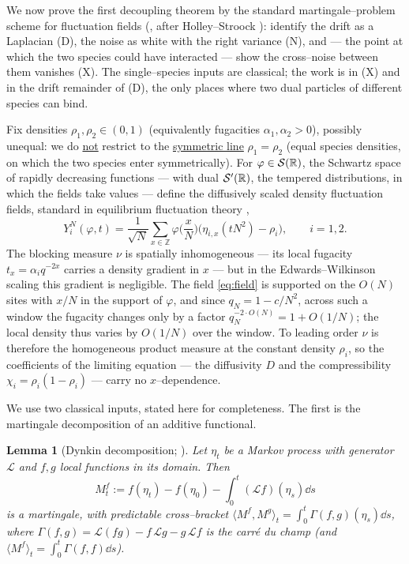 \documentclass[11pt]{article}
\theoremstyle{plain}
\newtheorem{lemma}[theorem]{Lemma}
\theoremstyle{definition}
\theoremstyle{remark}
\newcommand{\Z}{\mathbb{Z}}\newcommand{\R}{\mathbb{R}}\newcommand{\N}{\mathbb{N}}
\newcommand{\cL}{\mathcal L}\newcommand{\cO}{\mathcal O}\newcommand{\cE}{\mathcal E}
\begin{document}
We now prove the first decoupling theorem by the standard martingale--problem scheme for
fluctuation fields (\cite[Ch.~11]{KL}, after Holley--Stroock \cite{HolleyStroock}):
identify the drift as a Laplacian (D), the noise as white with the
right variance (N), and --- the point at which the two species could have interacted ---
show the cross--noise between them vanishes (X). The single--species inputs are
classical; the work is in (X) and in the drift remainder of (D), the only places where
two dual particles of different species can bind.

Fix densities $\rho_1,\rho_2\in(0,1)$ (equivalently fugacities $\alpha_1,\alpha_2>0$),
possibly unequal: we do \underline{not} restrict to the \underline{symmetric line} $\rho_1=\rho_2$
(equal species densities, on which the two species enter symmetrically). For
$\varphi\in\cS(\R)$, the Schwartz space of rapidly decreasing functions --- with dual
$\cS'(\R)$, the tempered distributions, in which the fields take values --- define the
diffusively scaled density fluctuation fields, standard in equilibrium fluctuation
theory \cite[Ch.~11]{KL},
\begin{equation}\label{eq:field}
  Y_i^N(\varphi,t)=\frac1{\sqrt N}\sum_{x\in\Z}\varphi\Big(\frac xN\Big)
   \big(\eta_{i,x}(tN^2)-\rho_i\big),\qquad i=1,2.
\end{equation}
The blocking measure $\nu$ is spatially inhomogeneous --- its local fugacity
$t_x=\alpha_i q^{-2x}$ carries a density gradient in $x$ --- but in the
Edwards--Wilkinson scaling this gradient is negligible. The field \eqref{eq:field} is
supported on the $O(N)$ sites with $x/N$ in the support of $\varphi$, and since
$q_N=1-c/N^2$, across such a window the fugacity changes only by a factor
$q_N^{-2\cdot O(N)}=1+O(1/N)$; the local density thus varies by $O(1/N)$ over the
window. To leading order $\nu$ is therefore the homogeneous product measure at the
constant density $\rho_i$, so the coefficients of the limiting equation --- the
diffusivity $D$ and the compressibility $\chi_i=\rho_i(1-\rho_i)$ --- carry no
$x$--dependence.

We use two classical inputs, stated here for completeness. The first is the martingale
decomposition of an additive functional.

\begin{lemma}[Dynkin decomposition; {\cite[App.~1.5]{KL}}]\label{lem:dynkin}
Let $\eta_t$ be a Markov process with generator $\cL$ and $f,g$ local functions in its
domain. Then
\[
  M^f_t:=f(\eta_t)-f(\eta_0)-\int_0^t(\cL f)(\eta_s)\dd s
\]
is a martingale, with predictable cross--bracket
$\langle M^f,M^g\rangle_t=\int_0^t\Gamma(f,g)(\eta_s)\dd s$, where
$\Gamma(f,g)=\cL(fg)-f\,\cL g-g\,\cL f$ is the carr\'e du champ (and
$\langle M^f\rangle_t=\int_0^t\Gamma(f,f)\dd s$).
\end{lemma}
\end{document}
